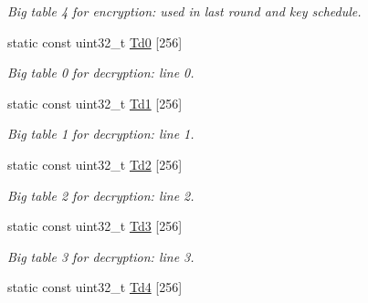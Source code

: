 \begin{DoxyCompactItemize}
\begin{DoxyCompactList}\small\item\em Big table 4 for encryption\+: used in last round and key schedule. \end{DoxyCompactList}\item 
\hypertarget{classAES_a8e09c19d389a95b9689c24be6f0fb3ae}{}static const uint32\+\_\+t \hyperlink{classAES_a8e09c19d389a95b9689c24be6f0fb3ae}{Td0} \mbox{[}256\mbox{]}\label{classAES_a8e09c19d389a95b9689c24be6f0fb3ae}

\begin{DoxyCompactList}\small\item\em Big table 0 for decryption\+: line 0. \end{DoxyCompactList}\item 
\hypertarget{classAES_aad13ea34f3cf92bc7f6d517ef8bbd216}{}static const uint32\+\_\+t \hyperlink{classAES_aad13ea34f3cf92bc7f6d517ef8bbd216}{Td1} \mbox{[}256\mbox{]}\label{classAES_aad13ea34f3cf92bc7f6d517ef8bbd216}

\begin{DoxyCompactList}\small\item\em Big table 1 for decryption\+: line 1. \end{DoxyCompactList}\item 
\hypertarget{classAES_af2213257dd362c06091daa5377b6cc3f}{}static const uint32\+\_\+t \hyperlink{classAES_af2213257dd362c06091daa5377b6cc3f}{Td2} \mbox{[}256\mbox{]}\label{classAES_af2213257dd362c06091daa5377b6cc3f}

\begin{DoxyCompactList}\small\item\em Big table 2 for decryption\+: line 2. \end{DoxyCompactList}\item 
\hypertarget{classAES_abbf0686f2ea9c74613777686c5014440}{}static const uint32\+\_\+t \hyperlink{classAES_abbf0686f2ea9c74613777686c5014440}{Td3} \mbox{[}256\mbox{]}\label{classAES_abbf0686f2ea9c74613777686c5014440}

\begin{DoxyCompactList}\small\item\em Big table 3 for decryption\+: line 3. \end{DoxyCompactList}\item 
\hypertarget{classAES_ab901a417097e09bd0d79f7644763cafd}{}static const uint32\+\_\+t \hyperlink{classAES_ab901a417097e09bd0d79f7644763cafd}{Td4} \mbox{[}256\mbox{]}\label{classAES_ab901a417097e09bd0d79f7644763cafd}


\end{DoxyCompactItemize}
